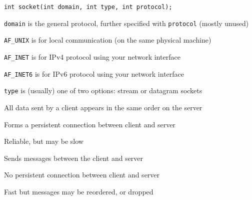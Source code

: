   \begin{slide}
    

    \texttt{int socket(int domain, int type, int protocol);}
    \medskip

    \texttt{domain} is the general protocol, further specified with \texttt{protocol} (mostly unused)

    \leftspace{}\texttt{AF\_UNIX} is for local communication (on the same physical machine)

    \leftspace{}\texttt{AF\_INET} is for IPv4 protocol using your network interface

    \leftspace{}\texttt{AF\_INET6} is for IPv6 protocol using your network interface
    \medskip

    \texttt{type} is (usually) one of two options: stream or datagram sockets

  \end{slide}

  \begin{slide}
    

    All data sent by a client appears in the same order on the server
    \medskip

    Forms a persistent connection between client and server
    \medskip

    Reliable, but may be slow

  \end{slide}

  \begin{slide}
    

    Sends messages between the client and server
    \medskip

    No persistent connection between client and server
    \medskip

    Fast but messages may be reordered, or dropped
  \end{slide}

